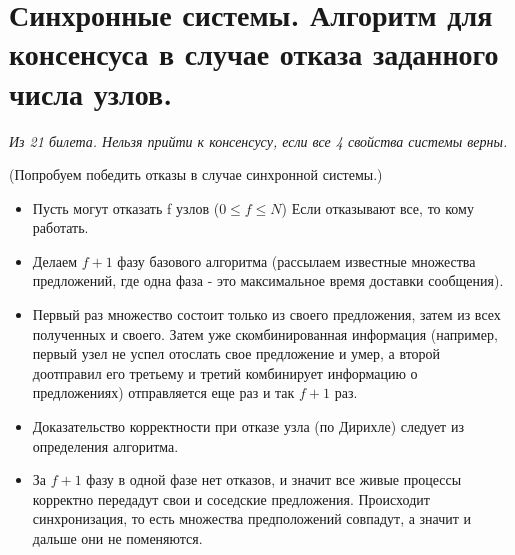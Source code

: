 \section{Синхронные системы. Алгоритм для консенсуса в случае отказа заданного числа узлов.}

\textit{ Из 21 билета. Нельзя прийти к консенсусу, если все 4 свойства системы верны. }

\begin{algorithm} (Попробуем победить отказы в случае синхронной системы.)
    \begin{itemize}
    \item Пусть могут отказать f узлов ($0 \leq f \le N$) Если отказывают все, то кому работать.
    \item Делаем $f + 1$ фазу базового алгоритма (рассылаем известные множества предложений, где одна фаза - это максимальное время доставки сообщения).
    \item Первый раз множество состоит только из своего предложения, затем из всех полученных и своего. Затем уже скомбинированная информация (например, первый узел не успел отослать свое предложение и умер, а второй доотправил его третьему и третий комбинирует информацию о предложениях) отправляется еще раз и так $f + 1$ раз.
    \item Доказательство корректности при отказе узла (по Дирихле) следует из определения алгоритма.
    \item За $f + 1$ фазу в одной фазе нет отказов, и значит все живые процессы корректно передадут свои и соседские предложения. Происходит синхронизация, то есть множества предположений совпадут, а значит и дальше они не поменяются.
    \end{itemize}
\end{algorithm}